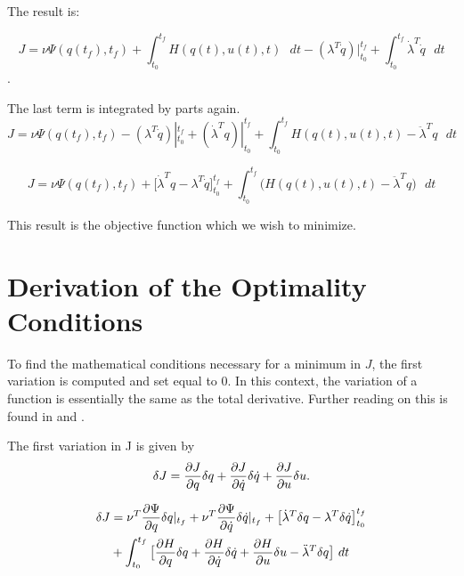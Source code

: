 The result is:

\begin{equation}
    J = \nu \Psi ( q(t_f),t_f ) + \int_{t_0}^{t_f}  H(q(t),u(t),t) \text{  } dt -(\lambda^T \dot q) |_{t_0}^{t_f} + \int_{t_0}^{t_f} \dot \lambda^T  \dot q\text{  } dt
\end{equation}.


The last term is integrated by parts again.\\

\begin{equation}
    J = \nu \Psi ( q(t_f),t_f ) - (\lambda^T \dot q)|_{t_0}^{t_f} + (\dot \lambda^T  q)|_{t_0}^{t_f} + \int_{t_0}^{t_f}  H(q(t),u(t),t) - \ddot \lambda^T q \text{  }dt
\end{equation}

\begin{equation}
    J = \nu \Psi ( q(t_f),t_f )  + \big[ \dot \lambda^T q - \lambda^T \dot q\big]_{t_0}^{t_f} + \int_{t_0}^{t_f}  \big( H(q(t),u(t),t) - \ddot \lambda^T q \big) \text{  } dt
\end{equation}




This result is the objective function which we wish to minimize.


\section{Derivation of the Optimality Conditions}


 To find the mathematical conditions necessary for a minimum in $J$, the first variation is computed and set equal to 0. In this context, the variation of a function is essentially the same as the total derivative. Further reading on this is found in \cite{marion1995classical} and  \cite{cornelius1970variational}.


The first variation in J is given by\\

\begin{equation}
    \delta  J = \frac{\partial J}{\partial q} \delta q + \frac{\partial J}{\partial \dot q} \delta \dot q   +  \frac{\partial J}{\partial u} \delta u.
\end{equation}


\begin{equation}
\begin{split}
    \delta  J &= \nu^T \frac{\partial \Psi}{\partial q}\delta q |_{t_f}
                 + \nu^T \frac{\partial \Psi}{\partial \dot q}\delta \dot q |_{t_f}
                 + \big[ \dot \lambda^T \delta q - \lambda^T  \delta \dot q\big]_{t_0}^{t_f}\\
               &+ \int_{t_0}^{t_f}  \big[ \frac{\partial H}{\partial q}\delta q +
                                           \frac{\partial H}{\partial \dot q}\delta \dot q
                                           + \frac{\partial H}{\partial u}\delta u
                                           - \ddot \lambda^T  \delta q  \big]   \text{  } dt\\
\end{split}
\end{equation}

